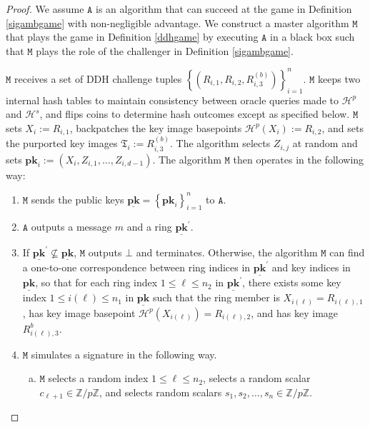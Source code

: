 \documentclass{mrl}
\theoremstyle{plain}
\theoremstyle{definition}
\begin{document}
\begin{proof}
We assume $\texttt{A}$ is an algorithm that can succeed at the game in Definition \ref{sigambgame} with non-negligible advantage. We construct a master algorithm $\texttt{M}$ that plays the game in Definition \ref{ddhgame} by executing $\texttt{A}$ in a black box such that $\texttt{M}$ plays the role of the challenger in Definition \ref{sigambgame}. 

$\texttt{M}$ receives a set of DDH challenge tuples $\left\{(R_{i,1}, R_{i,2}, R_{i,3}^{(b)})\right\}_{i=1}^{n}$. $\texttt{M}$ keeps two internal hash tables to maintain consistency between oracle queries made to $\mathcal{H}^p$ and $\mathcal{H}^s$, and flips coins to determine hash outcomes except as specified below. $\texttt{M}$ sets $X_i := R_{i,1}$, backpatches the key image basepoints $\mathcal{H}^p(X_i) := R_{i,2}$, and sets the purported key images $\mathfrak{T}_i := R_{i,3}^{(b)}$. The algorithm selects $Z_{i,j}$ at random and sets $\textbf{pk}_i := (X_i, Z_{i,1}, \ldots, Z_{i,d-1})$. The algorithm $\texttt{M}$ then operates in the following way:
\begin{enumerate}
\item $\texttt{M}$ sends the public keys $\underline{\textbf{pk}} = \left\{\textbf{pk}_i\right\}_{i=1}^{n}$ to $\texttt{A}$. 

\item $\texttt{A}$ outputs a message $m$ and a ring $\underline{\textbf{pk}}^\prime$. 

\item If $\underline{\textbf{pk}}^\prime \not\subseteq \underline{\textbf{pk}}$, $\texttt{M}$ outputs $\bot$ and terminates. Otherwise, the algorithm $\texttt{M}$ can find a one-to-one correspondence between ring indices in $\underline{\textbf{pk}}^\prime$ and key indices in $\underline{\textbf{pk}}$, so that for each ring index $1 \leq \ell \leq n_2$ in $\underline{\textbf{pk}}^\prime$, there exists some key index $1 \leq i(\ell) \leq n_1$ in $\underline{\textbf{pk}}$ such that the ring member is $X_{i(\ell)} = R_{i(\ell),1}$, has key image basepoint $\mathcal{H}^p(X_{i(\ell)}) = R_{i(\ell),2}$, and has key image $R_{i(\ell),3}^b$. 

\item $\texttt{M}$ simulates a signature in the following way.
\begin{enumerate}[(a)]
\item $\texttt{M}$ selects a random index $1 \leq \ell \leq n_2$, selects a random scalar $c_{\ell+1} \in \mathbb{Z}/p\mathbb{Z}$, and selects random scalars $s_1, s_2, \ldots, s_n \in \mathbb{Z}/p\mathbb{Z}$.


\end{enumerate}
\end{enumerate}
\end{proof}
\end{document}
